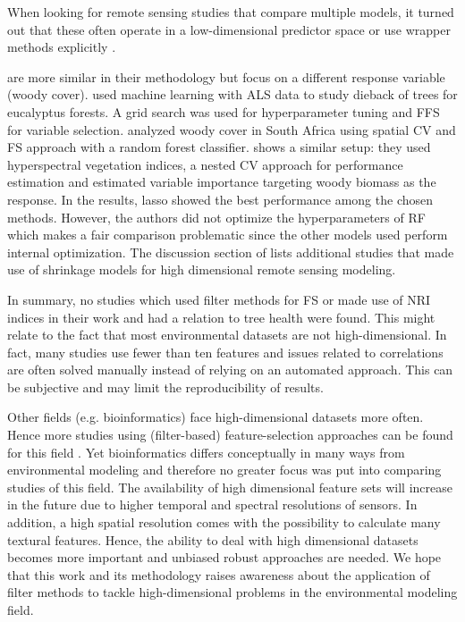 \documentclass[peerreview]{IEEEtran}
\begin{document}
When looking for remote sensing studies that compare multiple models, it turned out that these often operate in a low-dimensional predictor space \cite{xu2019} or use wrapper methods explicitly \cite{georganos2018}.

\cite{shendryk2016, ludwig2019} are more similar in their methodology but focus on a different response variable (woody cover).
\cite{shendryk2016} used machine learning with \ac{ALS} data to study dieback of trees for eucalyptus forests.
A grid search was used for hyperparameter tuning and \ac{FFS} for variable selection.
\cite{ludwig2019} analyzed woody cover in South Africa using spatial \ac{CV} and \ac{FS} approach \cite{meyer2018} with a random forest classifier.
\cite{zandler2015} shows a similar setup: they used hyperspectral vegetation indices, a nested CV approach for performance estimation and estimated variable importance targeting woody biomass as the response.
In the results, lasso showed the best performance among the chosen methods.
However, the authors did not optimize the hyperparameters of RF which makes a fair comparison problematic since the other models used perform internal optimization.
The discussion section of \cite{zandler2015} lists additional studies that made use of shrinkage models for high dimensional remote sensing modeling.

In summary, no studies which used filter methods for \ac{FS} or made use of \ac{NRI} indices in their work and had a relation to tree health were found.
This might relate to the fact that most environmental datasets are not high-dimensional.
In fact, many studies use fewer than ten features and issues related to correlations are often solved manually instead of relying on an automated approach.
This can be subjective and may limit the reproducibility of results.

Other fields (e.g. bioinformatics) face high-dimensional datasets more often.
Hence more studies using (filter-based) feature-selection approaches can be found for this field \cite{guo2019, radovic2017}.
Yet bioinformatics differs conceptually in many ways from environmental modeling and therefore no greater focus was put into comparing studies of this field.
The availability of high dimensional feature sets will increase in the future due to higher temporal and spectral resolutions of sensors.
In addition, a high spatial resolution comes with the possibility to calculate many textural features.
Hence, the ability to deal with high dimensional datasets becomes more important and unbiased robust approaches are needed.
We hope that this work and its methodology raises awareness about the application of filter methods to tackle high-dimensional problems in the environmental modeling field.
\end{document}
